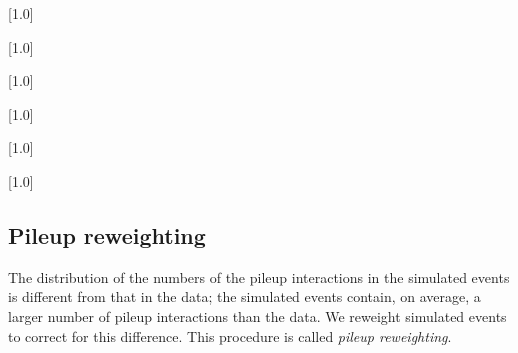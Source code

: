 \begin{table}[!p]
 \centering
{}
 \scriptsize
 \scalebox{.7}[1.0]{}
\end{table}

\begin{table}[!p]
 \centering
{}
 \scriptsize
 \scalebox{.7}[1.0]{}
\end{table}

\begin{table}[!p]
 \centering
{}
 \scriptsize
 \scalebox{.7}[1.0]{}
\end{table}

\begin{table}[!p]
 \centering
{}
 \scriptsize
 \scalebox{.7}[1.0]{}
\end{table}

\begin{table}[!p]
 \centering
 \scriptsize
 \scalebox{.7}[1.0]{}
\end{table}

\begin{table}[!p]
 \centering
 \scriptsize
 \scalebox{.7}[1.0]{}
 \label{tab:datasets_dm_ttbar_pseudoscalar}
\end{table}

\clearpage

\subsection{Pileup reweighting}

The distribution of the numbers of the pileup interactions in the
simulated events is different from that in the data; the simulated
events contain, on average, a larger number of pileup interactions than
the data. We reweight simulated events to correct for this difference.
This procedure is called \textit{pileup reweighting}.

